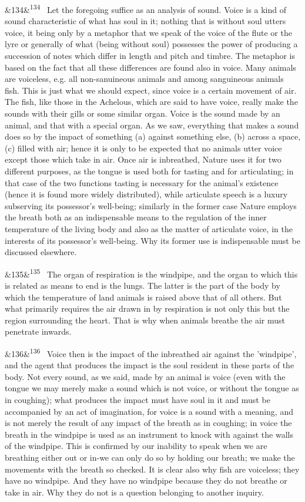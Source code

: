 \documentclass[12pt]{article}
\newcommand{\para}[1][]{\par\noindent\ifx&#1&\else\textsuperscript{\footnotesize #1}~\fi}
\begin{document}
\para[134] Let the foregoing suffice as an analysis of sound. Voice is a kind of sound characteristic of what has soul in it; nothing that is without soul utters voice, it being only by a metaphor that we speak of the voice of the flute or the lyre or generally of what (being without soul) possesses the power of producing a succession of notes which differ in length and pitch and timbre. The metaphor is based on the fact that all these differences are found also in voice. Many animals are voiceless, e.g. all non-sanuineous animals and among sanguineous animals fish. This is just what we should expect, since voice is a certain movement of air. The fish, like those in the Achelous, which are said to have voice, really make the sounds with their gills or some similar organ. Voice is the sound made by an animal, and that with a special organ. As we saw, everything that makes a sound does so by the impact of something (a) against something else, (b) across a space, (c) filled with air; hence it is only to be expected that no animals utter voice except those which take in air. Once air is inbreathed, Nature uses it for two different purposes, as the tongue is used both for tasting and for articulating; in that case of the two functions tasting is necessary for the animal's existence (hence it is found more widely distributed), while articulate speech is a luxury subserving its possessor's well-being; similarly in the former case Nature employs the breath both as an indispensable means to the regulation of the inner temperature of the living body and also as the matter of articulate voice, in the interests of its possessor's well-being. Why its former use is indispensable must be discussed elsewhere.

\para[135] The organ of respiration is the windpipe, and the organ to which this is related as means to end is the lungs. The latter is the part of the body by which the temperature of land animals is raised above that of all others. But what primarily requires the air drawn in by respiration is not only this but the region surrounding the heart. That is why when animals breathe the air must penetrate inwards.

\para[136] Voice then is the impact of the inbreathed air against the 'windpipe', and the agent that produces the impact is the soul resident in these parts of the body. Not every sound, as we said, made by an animal is voice (even with the tongue we may merely make a sound which is not voice, or without the tongue as in coughing); what produces the impact must have soul in it and must be accompanied by an act of imagination, for voice is a sound with a meaning, and is not merely the result of any impact of the breath as in coughing; in voice the breath in the windpipe is used as an instrument to knock with against the walls of the windpipe. This is confirmed by our inability to speak when we are breathing either out or in-we can only do so by holding our breath; we make the movements with the breath so checked. It is clear also why fish are voiceless; they have no windpipe. And they have no windpipe because they do not breathe or take in air. Why they do not is a question belonging to another inquiry.
\end{document}
